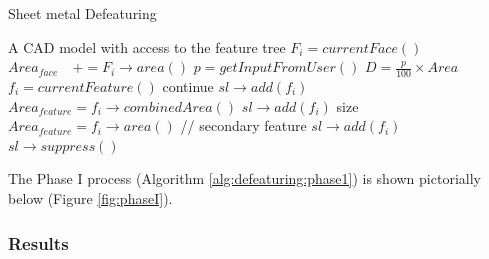 \vspace{-0.8cm}

\begin{algorithm}[!h]
	\caption{Sheet metal Defeaturing}
	\label{alg:defeaturing:phase1}
	\begin{algorithmic}
		\REQUIRE A CAD model with access to the feature tree
			\STATE $F_i = currentFace()$
			\STATE $Area_{face} \quad += F_i \rightarrow area()$
		\ENDWHILE		
		\STATE $p = getInputFromUser()$
		\STATE $D = \frac{p}{100} \times Area$  \hspace{60mm}%
			\STATE $f_i = currentFeature()$
				\STATE continue
				\STATE $sl \rightarrow add(f_i)$
			  	\STATE $Area_{feature} = f_i \rightarrow combinedArea()$ \hspace{20mm}  %
			  		\STATE $sl \rightarrow add(f_i)$
				\ENDIF
			\ELSE      
				\STATE size $Area_{feature} = f_i \rightarrow area()$  // secondary feature
			  		\STATE $sl \rightarrow add(f_i)$
				\ENDIF				
			\ENDIF
		\ENDWHILE
		\STATE  $sl \rightarrow suppress()$
	\end{algorithmic}
\end{algorithm}

\vspace{-1cm}

The Phase I process (Algorithm \ref{alg:defeaturing:phase1}) is shown pictorially below (Figure  \ref{fig:phaseI}).

\subsubsection{Results}

